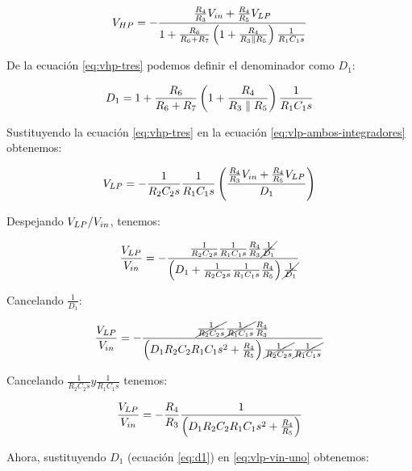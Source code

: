 \newcommand{\Denominador}{1 + \frac{R_6}{R_6 + R_7} \WrapParenthesis{1 + \frac{R_4}{R_3 \parallel R_5}}\frac{1}{R_1 C_1 s}}



\begin{equation}
    V_{HP} = - \frac{\frac{R_4}{R_3}V_{in} + \frac{R_4}{R_5}V_{LP}}{1 + \frac{R_6}{R_6 + R_7} \left( 1 + \frac{R_4}{R_3 \parallel R_5} \right)\frac{1}{R_1 C_1 s}}
    \label{eq:vhp-tres}
\end{equation}

De la ecuación \ref{eq:vhp-tres} podemos definir el denominador como $D_1$:

\begin{equation}
    D_1 = \Denominador
    \label{eq:d1}
\end{equation}



Sustituyendo la ecuación \ref{eq:vhp-tres} en la ecuación \ref{eq:vlp-ambos-integradores} obtenemos:

\begin{equation}
    V_{LP} = - \frac{1}{R_2 C_2 s} \frac{1}{R_1 C_1 s}\left( \frac{\frac{R_4}{R_3}V_{in} + \frac{R_4}{R_5}V_{LP}}{D_1} \right)
    \label{eq:vlp-ambos-integradores-sustituido}
\end{equation}

Despejando $V_{LP} / V_{in}$, tenemos:

\begin{equation}
    \frac{V_{LP}}{V_{in}} = - \frac{\frac{1}{R_2 C_2 s} \frac{1}{R_1 C_1 s} \frac{R_4}{R_3} \cancel{\frac{1}{D_1}}}{\left( D_1 +\frac{1}{R_2 C_2 s} \frac{1}{R_1 C_1 s} \frac{R_4}{R_5} \right) \cancel{\frac{1}{D_1}}}
\end{equation}

Cancelando $\frac{1}{D_1}$:

\begin{equation}
    \frac{V_{LP}}{V_{in}} = - \frac{\cancel{\frac{1}{R_2 C_2 s}} \cancel{\frac{1}{R_1 C_1 s}} \frac{R_4}{R_3}}{\left( D_1 R_2 C_2 R_1 C_1 s^2 + \frac{R_4}{R_5} \right)\cancel{\frac{1}{R_2 C_2 s}} \cancel{\frac{1}{R_1 C_1 s}}}
\end{equation}

Cancelando $\frac{1}{R_2 C_2 s} y \frac{1}{R_1 C_1 s}$ tenemos:

\begin{equation}
    \frac{V_{LP}}{V_{in}} = - \frac{R_4}{R_3}\frac{1}{\left( D_1 R_2 C_2 R_1 C_1 s^2 + \frac{R_4}{R_5} \right)}
    \label{eq:vlp-vin-uno}
\end{equation}

Ahora, sustituyendo $D_1$ (ecuación \ref{eq:d1}) en \ref{eq:vlp-vin-uno} obtenemos:

